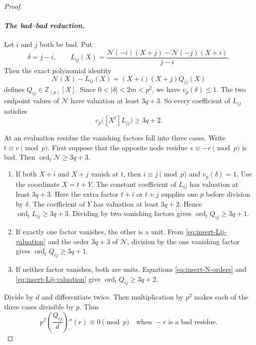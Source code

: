 \begin{proof}
\paragraph{\emph{The bad--bad reduction.}}
Let $i$ and $j$ both be bad.  Put
\begin{equation}
 \delta=j-i,\qquad
 L_{ij}(X)=
 \frac{\mathcal N(-i)(X+j)-\mathcal N(-j)(X+i)}{j-i}.
 \label{eq:insert-Lij}
\end{equation}
Then the exact polynomial identity
\begin{equation}
 \mathcal N(X)-L_{ij}(X)=(X+i)(X+j)Q_{ij}(X)
 \label{eq:insert-Qij}
\end{equation}
defines $Q_{ij}\in\mathbb Z_{(p)}[X]$.  Since $0<|\delta|<2m<p^2$, we have
$v_p(\delta)\leq1$.  The two endpoint values of $\mathcal N$ have
valuation at least $3q+3$.  So every coefficient of $L_{ij}$ satisfies
\begin{equation}
 v_p\bigl([X^\ell]L_{ij}\bigr)\geq3q+2.
 \label{eq:insert-Lij-valuation}
\end{equation}

At an evaluation residue the vanishing factors fall into three cases.
Write $t\equiv r\pmod p$.  First suppose that the opposite node residue
$s\equiv-r\pmod p$ is bad.  Then
$\operatorname{ord}_t\mathcal N\geq3q+3$.
\begin{enumerate}
\item If both $X+i$ and $X+j$ vanish at $t$, then $i\equiv j\pmod p$ and
  $v_p(\delta)=1$.  Use the coordinate $X=t+Y$.  The constant coefficient
 of $L_{ij}$ has valuation at least $3q+3$.  Here the extra factor $t+i$
  or $t+j$ supplies one $p$ before division by $\delta$.  The coefficient
  of $Y$ has valuation at least $3q+2$.  Hence
  $\operatorname{ord}_tL_{ij}\geq3q+3$.
  Dividing by two vanishing factors gives
  $\operatorname{ord}_tQ_{ij}\geq3q+1$.
\item If exactly one factor vanishes, the other is a unit.  From
  \eqref{eq:insert-Lij-valuation} and the order $3q+3$ of $\mathcal N$,
  division by the one vanishing factor gives
  $\operatorname{ord}_tQ_{ij}\geq3q+1$.
\item If neither factor vanishes, both are units.  Equations
  \eqref{eq:insert-N-orders} and \eqref{eq:insert-Lij-valuation} give
  $\operatorname{ord}_tQ_{ij}\geq3q+2$.
\end{enumerate}
Divide by $d$ and differentiate twice.  Then multiplication by $p^2$ makes
each of the three cases divisible by $p$.  Thus
\begin{equation}
 p^2\left(\frac{Q_{ij}}d\right)''(r)\equiv0\pmod p
 \quad\text{when }-r\text{ is a bad residue}.               
 \label{eq:insert-Q-bad-residue}
\end{equation}


\end{proof}

